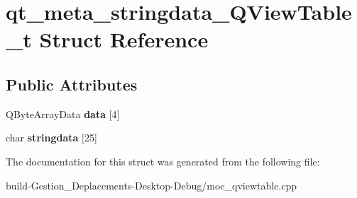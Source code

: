 \section{qt\-\_\-meta\-\_\-stringdata\-\_\-\-Q\-View\-Table\-\_\-t Struct Reference}
\label{structqt__meta__stringdata___q_view_table__t}
\subsection*{Public Attributes}
\begin{DoxyCompactItemize}
\item 
Q\-Byte\-Array\-Data {\bfseries data} [4]\label{structqt__meta__stringdata___q_view_table__t_aacad6a9f84d6693be5938848d2cb1545}

\item 
char {\bfseries stringdata} [25]\label{structqt__meta__stringdata___q_view_table__t_a43b25bfc3e296e075ae0380ac079d230}

\end{DoxyCompactItemize}


The documentation for this struct was generated from the following file\-:\begin{DoxyCompactItemize}
\item 
build-\/\-Gestion\-\_\-\-Deplacements-\/\-Desktop-\/\-Debug/moc\-\_\-qviewtable.\-cpp\end{DoxyCompactItemize}
